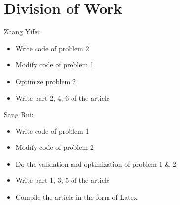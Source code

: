 \documentclass{article}
\begin{document}
\maketitle

\newpage


\newpage


\newpage


\newpage


\newpage


\newpage


\newpage
\printbibliography[heading=bibliography]

\newpage
\section*{Division of Work}

Zhang Yifei: 
\begin{itemize}
    \item Write code of problem 2
    \item Modify code of problem 1 
    \item Optimize problem 2
    \item Write part 2, 4, 6 of the article
\end{itemize}

\noindent Sang Rui: 
\begin{itemize}
    \item Write code of problem 1
    \item Modify code of problem 2
    \item Do the validation and optimization of problem 1 \& 2
    \item Write part 1, 3, 5 of the article
    \item Compile the article in the form of Latex
\end{itemize}
\end{document}
